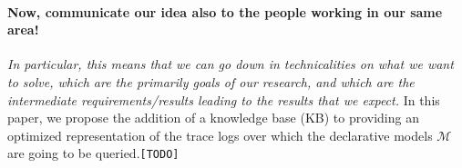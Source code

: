 \paragraph*{Now, communicate our idea also to the people working in our same area!} \textit{In particular, this means that we can go down in technicalities on what we want to solve, which are the primarily goals of our research, and which are the intermediate requirements/results leading to the results that we expect.} 
In this paper, we propose the addition of a knowledge base (KB) to providing an optimized representation of the trace logs over which the declarative models $\mathcal{M}$ are going to be queried.\texttt{\color{red}[TODO]} %
